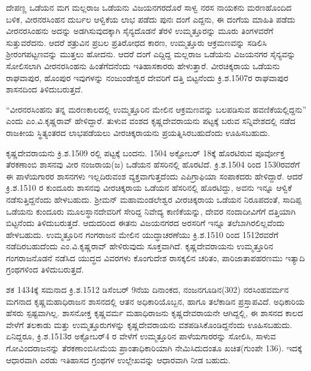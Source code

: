 ದೇಪಣ್ಣ ಒಡೆಯನ ಮಗ ಮಲ್ಲರಾಜ ಒಡೆಯನು ವಿಜಯನಗರದೊರೆ ಸಾಳ್ವ ನರಸ ನಾಯಕನು ಮರಣಹೊಂದಿದ ಬಳಿಕ, ವೀರನರಸಿಂಹನ ದುರ್ಬಲ ಆಳ್ವಿಕೆಯ ಲಾಭ ಪಡೆದು ಪುನಃ ದಂಗೆ ಎದ್ದನು, ಈ ದಂಗೆಯ ಮಾಹಿತಿ ಪಡೆದು ವೀರನರಸಿಂಹನು ಅದನ್ನು ಅಡಗಿಸುವುದಕ್ಕಾಗಿ ಸೈನ್ಯದೊಡನೆ ತೆರಳಿ ಉಮ್ಮತ್ತೂರನ್ನು ಮೂರು ತಿಂಗಳವರೆಗೆ ಸುತ್ತುವರೆದನು. ಆದರೆ ಶತ್ರುವಿನ ಪ್ರಬಲ ಪ್ರತಿರೋಧದ ಕಾರಣ, ಉಮ್ಮತ್ತೂರು ಆಕ್ರಮಣವನ್ನು ಸಡಿಲಿಸಿ ಶ‍್ರೀರಂಗಪಟ್ಟಣವನ್ನು ಮುತ್ತಲು ಹೋದನು. ಆದರೆ ದಂಗೆ ಎದ್ದಿದ್ದ ಮಲ್ಲರಾಜ ಒಡೆಯನು ವಿಜಯನಗರ ಸೈನ್ಯವನ್ನು ಸೋಲಿಸಲಾಗಿ ವೀರನರಸಿಂಹನು ಹಿಂತೆಗೆದನೆಂದು ಇತಿಹಾಸಕಾರರು ಹೇಳುತ್ತಾರೆ. ವೀರಚಿಕ್ಕರಾಯ ಒಡೆಯನು ರಾಘವಾಪುರ, ಹೊಂಪುರ ಇವುಗಳನ್ನು ನಂಜುಂಡೇಶ್ವರ ದೇವರಿಗೆ ದತ್ತಿ ಬಿಟ್ಟನೆಂದು ಕ್ರಿ.ಶ.1507ರ ರಾಘವಾಪುರ ಶಾಸನದಿಂದ ತಿಳಿದುಬರುತ್ತದೆ.

“ವೀರನರಸಿಂಹನು ತನ್ನ ಮರಣಕಾಲದಲ್ಲಿ ಉಮ್ಮತ್ತೂರಿನ ಮೇಲಿನ ಆಕ್ರಮಣವನ್ನು ಬಲಪಡಿಸುವ ಹವಣಿಕೆ\-ಯಲ್ಲಿದ್ದನು” ಎಂದು ಎಂ.ವಿ.ಕೃಷ್ಣರಾವ್​ ಹೇಳಿದ್ದಾರೆ. ತುಳುವ ವಂಶದ ಕೃಷ್ಣದೇವರಾಯನು ಪಟ್ಟಕ್ಕೆ ಬರುವ ಸನ್ನಿವೇಶದಲ್ಲಿ ನಡೆದ ರಾಜಕೀಯ ಸ್ಥಿತ್ಯಂತರದ ಲಾಭಪಡೆಯಲು ವೀರಚಿಕ್ಕರಾಯನು ಪ್ರಯತ್ನಿಸಿರಬಹುದೆಂದು ಊಹಿಸಬಹುದು.

ಕೃಷ್ಣದೇವರಾಯನು ಕ್ರಿ.ಶ.1509 ರಲ್ಲಿ ಪಟ್ಟಕ್ಕೆ ಬಂದನು. 1504 ಅಕ್ಟೋಬರ್​ 18ಕ್ಕೆ ಹೊರಟಿರುವ ಪೂರ್ವೋಕ್ತ ತೆರಕಣಾಂಬಿ ಶಾಸನವು ವೀರ ನಂಜರಾಯ(ಜ) ಒಡೆಯನ ಹೆಸರಿನಲ್ಲಿ ಹೊರಟಿದೆ. ಕ್ರಿ.ಶ.1504 ರಿಂದ 1530ರವರೆಗೆ ಈ ಪಾಳೆಯಗಾರರ ಶಾಸನಗಳು ಇಲ್ಲದಿರುವಂಶ ವ್ಯಕ್ತವಾಗುತ್ತದೆಂದು ಎಪಿಗ್ರಾಫಿಯಾ ಸಂಪಾಕದರು ಹೇಳಿದ್ದಾರೆ. ಆದರೆ ಕ್ರಿ.ಶ.1510 ರ ಕುಂದೂರು ಶಾಸನವು ವೀರಚಿಕ್ಕರಾಯ ಒಡೆಯನ ಹೆಸರಿನಲ್ಲಿ ಹೊರಟಿದ್ದು, ಅವನು ಇನ್ನೂ ಆಳ್ವಿಕೆ ನಡೆಸುತ್ತಿದ್ದನೆಂದು ಹೇಳಬಹುದು. ಶ‍್ರೀಮನ್​ ಮಹಾಮಂಡಲೇಶ್ವರ ವೀರಚಿಕ್ಕರಾಯ ಒಡೆಯನ ನಿರೂಪದಂತೆ, ಸಾದಿಪ್ಪ ಒಡೆಯನು ಕುಂದೂರು ಮೂಲಸ್ಥಾನದೇವರಿಗೆ ಸೇರಿದ್ದ ನಿವೇದ್ಯ ಕಾಣಿಕೆಯನ್ನು, ದೇವರ ನಂದಾದೀವಿಗೆಗೆ ದತ್ತಿಯಾಗಿ ಬಿಟ್ಟನೆಂದು ತಿಳಿದುಬರುತ್ತದೆ. ಆದುದರಿಂದ ಈತನು ವಿಜಯನಗರದ ಅರಸರಿಗೆ ಇನ್ನೂ ತಲೆಬಾಗಿರಲಿಲ್ಲವೆಂದು ಹೇಳ\-ಬಹುದು. ಉಮ್ಮತ್ತೂರಿನ ಗಂಗರಾಜನ ಮೇಲಿನ ಯುದ್ಧಾಚರಣೆಯು ಕ್ರಿ.ಶ.1510 ರಿಂದ 1512ರವರೆಗೆ ನಡೆದಿರಬಹುದೆಂದು ಎಂ.ವಿ.ಕೃಷ್ಣರಾವ್​ ಹೇಳಿರುವುದು ಸೂಕ್ತವಾಗಿದೆ. ಕೃಷ್ಣದೇವರಾಯನು ಉಮ್ಮತ್ತೂರಿನ ಗಂಗರಾಜನೊಡನೆ ನಡೆಸಿದ ಯುದ್ಧದ ವಿವರಗಳು ಕೊಂಗುದೇಶ ರಾಸಕ್ಕಲಿನ ಚರಿತಂ, ಪಾರಿಜಾತಾಪಹರಣಮು ಇತ್ಯಾದಿ ಗ್ರಂಥಗಳಿಂದ ತಿಳಿದುಬರುತ್ತದೆ.

ಶಕ 1434ಕ್ಕೆ ಸಮನಾದ ಕ್ರಿ.ಶ.1512 ಡಿಸೆಂಬರ್​ 9ನೆಯ ದಿನಾಂಕದ, ನಂಜನಗೂಡಿನ(302) ನರಸಿಂಹವರ್ಮನ ಮಗನಾದ ಕೃಷ್ಣಮಹಾಧಿರಾಜನ ಶಾಸನದಲ್ಲಿ ಆತನ ಅಧಿಕಾರಿಯೊಬ್ಬನ, ಹಾಗೂ ತಲೆಕಾಡಿನ ಪ್ರಸ್ತಾಪವಿದೆ. ಅಧಿಕಾರಿಯ ಹೆಸರು ಸ್ಪಷ್ಟವಾಗಿಲ್ಲ. ಶಾಸನೋಕ್ತ ಕೃಷ್ಣವರ್ಮ ಮಹಾಧಿರಾಜನು ಕೃಷ್ಣದೇವರಾಯನೇ ಆಗಿದ್ದಲ್ಲಿ, ಈ ಶಾಸನದ ಕಾಲದ ವೇಳೆಗೆ ತಲಕಾಡು ಮತ್ತು ಉಮ್ಮತ್ತೂರುಗಳನ್ನು ಕೃಷ್ಣದೇವರಾಯನು ವಶಪಡಿಸಿಕೊಂಡಿದ್ದನೆಂದು ಊಹಿಸಬಹುದು. ಏನಿದ್ದರೂ, ಕ್ರಿ.ಶ.1513ರ ಅಕ್ಟೋಬರ್​4 ರ ವೇಳೆಗೆ ಉಮ್ಮತ್ತೂರಿನ ಪಾಳೆಯಗಾರರನ್ನು ಸೋಲಿಸಿ, ಸಾಳುವ ಗೋವಿಂದರಾಜನನ್ನು ತೆರಕಣಾಂಬಿಸೀಮೆಯ ಪ್ರಾಂತಾಧಿಕಾರಿಯಾಗಿ ನೇಮಿಸಿದುದಂತೂ ಖಚಿತ(ಗುಂಪೇ 136). ಇದಕ್ಕೆ ಆಧಾರವಾಗಿ ಎರಡು ಇತಿಹಾಸದ ಗ್ರಂಥಗಳ ಉಲ್ಲೇಖವನ್ನು ಆಧಾರವಾಗಿ ನೀಡ ಬಹುದು.

